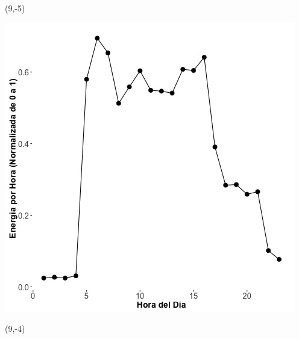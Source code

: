 \documentclass{article}\usepackage[]{graphicx}\usepackage[]{color}
\newenvironment{knitrout}{}{} %
\begin{document}
 \begin{textblock}{1}(9,-5)
\begin{minipage}{20em}
\begingroup

\endgroup
\end{minipage}
\end{textblock}

\begin{knitrout}
\color{fgcolor}
\includegraphics[scale=0.65]{figure/A16_plot_norm_median} 
\end{knitrout}


 \begin{textblock}{1}(9,-4)
\begin{minipage}{20em}
\begingroup

\endgroup
\end{minipage}
\end{textblock}
\end{document}
